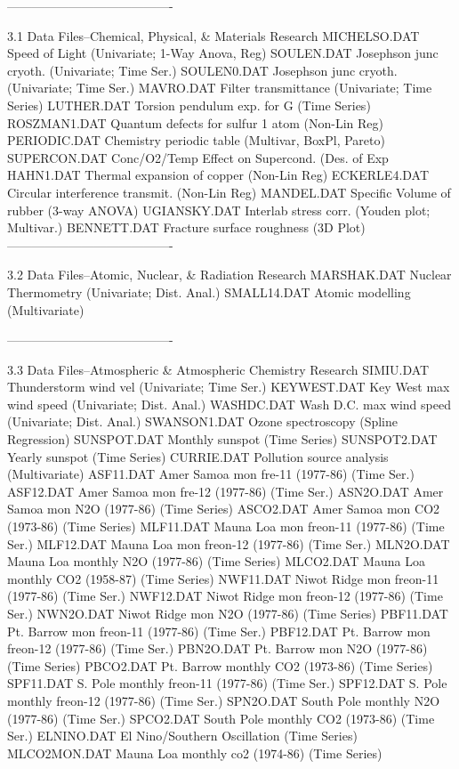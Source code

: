 ----------------------------------------
 
3.1
Data Files--Chemical, Physical, & Materials Research
      MICHELSO.DAT  Speed of Light (Univariate; 1-Way Anova, Reg)
      SOULEN.DAT    Josephson junc cryoth. (Univariate; Time Ser.)
      SOULEN0.DAT   Josephson junc cryoth. (Univariate; Time Ser.)
      MAVRO.DAT     Filter transmittance (Univariate; Time Series)
      LUTHER.DAT    Torsion pendulum exp. for G (Time Series)
      ROSZMAN1.DAT  Quantum defects for sulfur 1 atom (Non-Lin Reg)
      PERIODIC.DAT  Chemistry periodic table (Multivar, BoxPl, Pareto)
      SUPERCON.DAT  Conc/O2/Temp Effect on Supercond. (Des. of Exp
      HAHN1.DAT     Thermal expansion of copper (Non-Lin Reg)
      ECKERLE4.DAT  Circular interference transmit. (Non-Lin Reg)
      MANDEL.DAT    Specific Volume of rubber (3-way ANOVA)
      UGIANSKY.DAT  Interlab stress corr. (Youden plot; Multivar.)
      BENNETT.DAT   Fracture surface roughness (3D Plot)
----------------------------------------
 
3.2
Data Files--Atomic, Nuclear, & Radiation Research
      MARSHAK.DAT   Nuclear Thermometry    (Univariate; Dist. Anal.)
      SMALL14.DAT   Atomic modelling (Multivariate)
 
----------------------------------------
 
3.3
Data Files--Atmospheric & Atmospheric Chemistry Research
      SIMIU.DAT     Thunderstorm wind vel (Univariate; Time Ser.)
      KEYWEST.DAT   Key West max wind speed (Univariate; Dist. Anal.)
      WASHDC.DAT    Wash D.C. max wind speed (Univariate; Dist. Anal.)
      SWANSON1.DAT  Ozone spectroscopy (Spline Regression)
      SUNSPOT.DAT   Monthly sunspot (Time Series)
      SUNSPOT2.DAT  Yearly sunspot (Time Series)
      CURRIE.DAT    Pollution source analysis (Multivariate)
      ASF11.DAT     Amer Samoa mon fre-11 (1977-86) (Time Ser.)
      ASF12.DAT     Amer Samoa mon fre-12 (1977-86) (Time Ser.)
      ASN2O.DAT     Amer Samoa mon N2O (1977-86) (Time Series)
      ASCO2.DAT     Amer Samoa mon CO2 (1973-86) (Time Series)
      MLF11.DAT     Mauna Loa mon freon-11 (1977-86) (Time Ser.)
      MLF12.DAT     Mauna Loa mon freon-12 (1977-86) (Time Ser.)
      MLN2O.DAT     Mauna Loa monthly N2O (1977-86) (Time Series)
      MLCO2.DAT     Mauna Loa monthly CO2 (1958-87) (Time Series)
      NWF11.DAT     Niwot Ridge mon freon-11 (1977-86) (Time Ser.)
      NWF12.DAT     Niwot Ridge mon freon-12 (1977-86) (Time Ser.)
      NWN2O.DAT     Niwot Ridge mon N2O (1977-86) (Time Series)
      PBF11.DAT     Pt. Barrow mon freon-11 (1977-86) (Time Ser.)
      PBF12.DAT     Pt. Barrow mon freon-12 (1977-86) (Time Ser.)
      PBN2O.DAT     Pt. Barrow mon N2O (1977-86) (Time Series)
      PBCO2.DAT     Pt. Barrow monthly CO2 (1973-86) (Time Series)
      SPF11.DAT     S. Pole monthly freon-11 (1977-86) (Time Ser.)
      SPF12.DAT     S. Pole monthly freon-12 (1977-86) (Time Ser.)
      SPN2O.DAT     South Pole monthly N2O (1977-86) (Time Ser.)
      SPCO2.DAT     South Pole monthly CO2 (1973-86) (Time Ser.)
      ELNINO.DAT    El Nino/Southern Oscillation (Time Series)
      MLCO2MON.DAT  Mauna Loa monthly co2 (1974-86) (Time Series)
 
